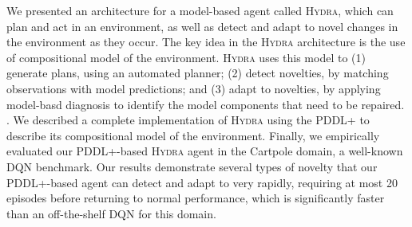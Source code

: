 \documentclass[letterpaper]{article} %
\newcommand{\hydra}{\textsc{Hydra}\xspace} %
\begin{document}
We presented an architecture for a model-based agent called \hydra, which can plan and act in an environment, as well as detect and adapt to novel changes in the environment as they occur. 
The key idea in the \hydra architecture is the use of compositional model of the environment. 
\hydra uses this model to (1) generate plans, using an automated planner; (2) detect novelties, by matching observations with model predictions; and (3) adapt to novelties, by applying model-basd diagnosis to identify the model components that need to be repaired. 
. %
We described a complete implementation of \hydra using the PDDL+ to describe its compositional model of the environment.   
Finally, we empirically evaluated our PDDL+-based \hydra agent in the Cartpole domain, a well-known DQN benchmark.
Our results demonstrate several types of novelty that our PDDL+-based agent can detect and adapt to very rapidly, requiring at most 20 episodes before returning to normal performance, which is significantly faster than an off-the-shelf DQN for this domain. 





\end{document}
